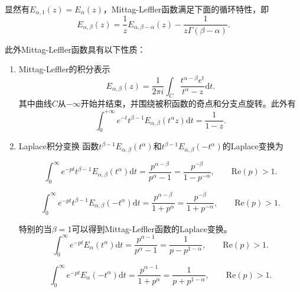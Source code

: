显然有$E_{\alpha,1}\left(z\right) = E_{\alpha}\left(z\right)$，Mittag-Leffler函数满足下面的循环特性，即
\begin{equation}
E_{\alpha,\beta}\left(z\right)=\frac{1}{z} E_{\alpha, \beta-\alpha }\left(z\right)-\frac {1}{z\Gamma\left(\beta -\alpha\right)}.
\end{equation}

\begin{property}
	此外Mittag-Leffler函数具有以下性质：
	\begin{enumerate}[noitemsep]
		\item Mittag-Leffler的积分表示
		\begin{equation}
		E_{{\alpha,\beta }}\left(z\right)={\frac{1}{2\pi i}}\int _{C}{\frac  {t^{{\alpha -\beta }}e^{t}}{t^{\alpha }-z}}\mathrm{d}t.
		\end{equation}
		其中曲线$C$从$-\infty$开始并结束，并围绕被积函数的奇点和分支点旋转。此外有
		\begin{equation}
		\int _{0}^{ +\infty }e^{-t}t^{\beta -1}E_{\alpha ,\beta }\left(t^{\alpha} z\right)\mathrm{d}t={\frac{1}{1-z}}.
		\end{equation}
		\item Laplace积分变换
		函数$t^{\beta -1}E_{\alpha ,\beta }\left(t^{\alpha }\right)$和$t^{\beta -1}E_{\alpha ,\beta }\left(-t^{\alpha }\right)$的Laplace变换为
		
		\begin{equation}
		\int _{0}^{\infty }e^{-pt}t^{\beta -1}E_{\alpha ,\beta }\left(t^{\alpha }\right)\mathrm{d}t={\frac {p^{\alpha-\beta }}{p^{\alpha}-1}}={\frac {p^{-\beta }}{1-p^{-\alpha}}}, \qquad \mathrm{Re}\left(p\right)>1.
		\end{equation}
		
		\begin{equation}
		\int _{0}^{\infty }e^{-pt}t^{\beta -1}E_{\alpha ,\beta }\left(-t^{\alpha }\right)\mathrm{d}t={\frac {p^{\alpha-\beta }}{1+p^{\alpha}}}={\frac {p^{-\beta }}{1+p^{-\alpha}}}, \qquad \mathrm{Re}\left(p\right)>1.
		\end{equation}
		
		特别的当$\beta = 1$可以得到Mittag-Leffler函数的Laplace变换。
		\begin{equation}
		\int _{0}^{\infty }e^{-pt}E_{\alpha}\left(t^{\alpha }\right)\mathrm{d}t={\frac {p^{\alpha-1}}{p^{\alpha}-1}}={\frac {1}{p-p^{1-\alpha}}}, \qquad \mathrm{Re}\left(p\right)>1.
		\end{equation}
		
		\begin{equation}
		\int _{0}^{\infty }e^{-pt}E_{\alpha}\left(-t^{\alpha }\right)\mathrm{d}t={\frac {p^{\alpha-1}}{1+p^{\alpha}}}={\frac {1}{p+p^{1-\alpha}}}, \qquad \mathrm{Re}\left(p\right)>1.
		\end{equation}
		

\end{enumerate}
\end{property}
